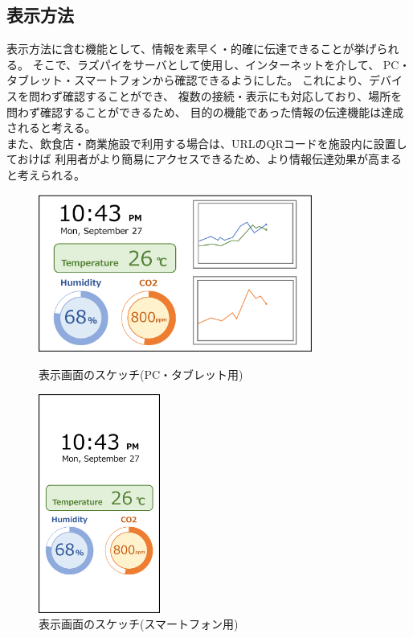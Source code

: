 \documentclass[a4paper]{jsarticle}
\begin{document}
\subsection{表示方法}
表示方法に含む機能として、情報を素早く・的確に伝達できることが挙げられる。
そこで、ラズパイをサーバとして使用し、インターネットを介して、
PC・タブレット・スマートフォンから確認できるようにした。
これにより、デバイスを問わず確認することができ、
複数の接続・表示にも対応しており、場所を問わず確認することができるため、
目的の機能であった情報の伝達機能は達成されると考える。\\
また、飲食店・商業施設で利用する場合は、URLのQRコードを施設内に設置しておけば
利用者がより簡易にアクセスできるため、より情報伝達効果が高まると考えられる。
\begin{figure}[htbp]
    \begin{minipage}{0.6\hsize}
        \begin{center}
            \includegraphics[width=90mm]{images/sketch1.png}
        \end{center}
        \caption{表示画面のスケッチ(PC・タブレット用)}
        \label{fig:one}
    \end{minipage}
    \begin{minipage}{0.4\hsize}
        \begin{center}
            \includegraphics[width=40mm]{images/sketch2.png}
        \end{center}
        \caption{表示画面のスケッチ(スマートフォン用)}
        \label{fig:two}
    \end{minipage}
\end{figure}
\end{document}

